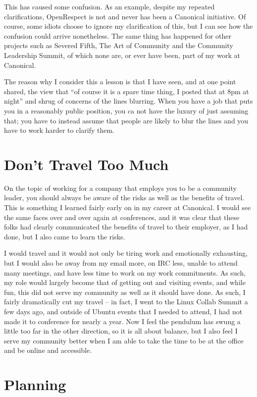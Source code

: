This has caused some confusion. As an example, despite my repeated clarifications, OpenRespect is not and never has been a Canonical initiative. Of course, some idiots choose to ignore my clarification of this, but I can see how the confusion could arrive nonetheless. The same thing has happened for other projects such as Severed Fifth, The Art of Community and the Community Leadership Summit, of which none are, or ever have been, part of my work at Canonical.

The reason why I consider this a lesson is that I have seen, and at one point shared, the view that ``of course it is a spare time thing, I posted that at 8pm at night'' and shrug of concerns of the lines blurring. When you have a job that puts you in a reasonably public position, you ca not have the luxury of just assuming that; you have to instead assume that people are likely to blur the lines and you have to work harder to clarify them.

\section*{Don’t Travel Too Much}

On the topic of working for a company that employs you to be a community leader, you should always be aware of the risks as well as the benefits of travel. This is something I learned fairly early on in my career at Canonical. I would see the same faces over and over again at conferences, and it was clear that these folks had clearly communicated the benefits of travel to their employer, as I had done, but I also came to learn the risks.

I would travel and it would not only be tiring work and emotionally exhausting, but I would also be away from my email more, on IRC less, unable to attend many meetings, and have less time to work on my work commitments. As such, my role would largely become that of getting out and visiting events, and while fun, this did not serve my community as well as it should have done. As such, I fairly dramatically cut my travel -- in fact, I went to the Linux Collab Summit a few days ago, and outside of Ubuntu events that I needed to attend, I had not made it to conference for nearly a year. Now I feel the pendulum has swung a little too far in the other direction, so it is all about balance, but I also feel I serve my community better when I am able to take the time to be at the office and be online and accessible.

\section*{Planning}

